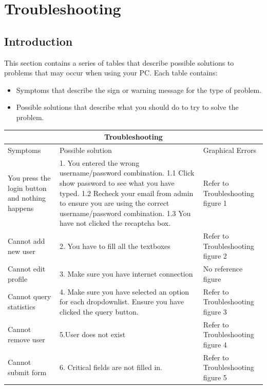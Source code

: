 \documentclass[14pt, a4paper]{article}
\begin{document}
\section{Troubleshooting}
\subsection{Introduction}
This section contains a series of tables that describe
possible solutions to problems that may occur when
using your PC. Each table contains: \\
\begin{itemize}
	\item Symptoms that describe the sign or warning message for the type of problem.
	\item Possible solutions that describe what you should
do to try to solve the problem. 
\end{itemize}

\setlength{\arrayrulewidth}{1mm}
\setlength{\tabcolsep}{18pt}
\renewcommand{\arraystretch}{1.5}
 

\begin{tabular}{ |p{3.5cm}|p{3.5cm} | p{3.5cm}|  }
\hline
\multicolumn{3}{|c|}{Troubleshooting} \\
\hline
Symptoms & Possible solution  & Graphical Errors\\
\hline
You press the login button and nothing happens & 1. You entered the wrong username/password combination. 1.1 Click show password to see what you have typed. 1.2 Recheck your email from admin to ensure you are using the correct username/password combination. 1.3 You have not clicked the recaptcha box.   & Refer to Troubleshooting figure 1\\ \hline
Cannot add new user & 2. You have to fill all the textboxes & Refer to Troubleshooting figure 2\\ \hline
Cannot edit profile    & 3. Make sure you have internet connection & No reference figure \\ \hline
Cannot query statistics & 4. Make sure you have selected an option for each dropdownlist. Ensure you have clicked the query button.  & Refer to Troubleshooting figure 3\\
Cannot remove user & 5.User does not exist & Refer to Troubleshooting figure 4\\ \hline
Cannot submit form & 6. Critical fields are not filled in. & Refer to Troubleshooting figure 5\\ \hline
\hline
\end{tabular}
\end{document}
